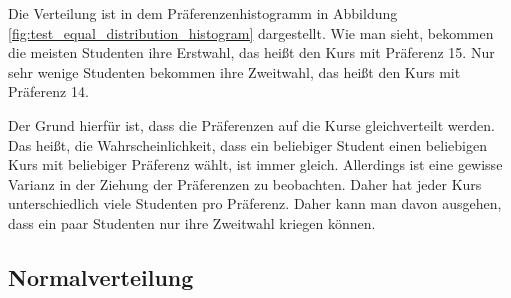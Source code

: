 			Die Verteilung ist in dem Präferenzenhistogramm in Abbildung \ref{fig:test_equal_distribution_histogram} dargestellt.
			Wie man sieht, bekommen die meisten Studenten ihre Erstwahl, das heißt den Kurs mit Präferenz 15.
			Nur sehr wenige Studenten bekommen ihre Zweitwahl, das heißt den Kurs mit Präferenz 14.\newline
			
			Der Grund hierfür ist, dass die Präferenzen auf die Kurse gleichverteilt werden.
			Das heißt, die Wahrscheinlichkeit, dass ein beliebiger Student einen beliebigen Kurs mit beliebiger Präferenz wählt, ist immer gleich.
			Allerdings ist eine gewisse Varianz in der Ziehung der Präferenzen zu beobachten.
			Daher hat jeder Kurs unterschiedlich viele Studenten pro Präferenz.
			Daher kann man davon ausgehen, dass ein paar Studenten nur ihre Zweitwahl kriegen können.\newline
		
		\subsection{Normalverteilung}
		
